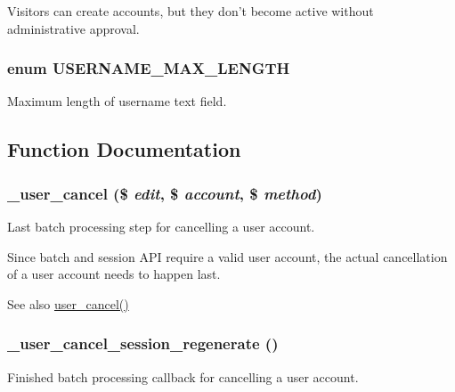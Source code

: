 \label{user_8module_a46063390f086e98c8db7e380c0fa1fd5}
Visitors can create accounts, but they don't become active without administrative approval. \hypertarget{user_8module_ab5066e0a1cb5ba39be9389bdb7341e9c}{
\subsubsection[{USERNAME\_\-MAX\_\-LENGTH}]{\setlength{\rightskip}{0pt plus 5cm}enum {\bf USERNAME\_\-MAX\_\-LENGTH}}}
\label{user_8module_ab5066e0a1cb5ba39be9389bdb7341e9c}
Maximum length of username text field. 

\subsection{Function Documentation}
\hypertarget{user_8module_afc9203f67609047039df65af5de60739}{
\subsubsection[{\_\-user\_\-cancel}]{\setlength{\rightskip}{0pt plus 5cm}\_\-user\_\-cancel (\$ {\em edit}, \/  \$ {\em account}, \/  \$ {\em method})}}
\label{user_8module_afc9203f67609047039df65af5de60739}
Last batch processing step for cancelling a user account.

Since batch and session API require a valid user account, the actual cancellation of a user account needs to happen last.

\begin{DoxySeeAlso}{See also}
\hyperlink{user_8module_af6ef747e6353edaecc43f55dc85eff9e}{user\_\-cancel()} 
\end{DoxySeeAlso}
\hypertarget{user_8module_ade553a108fdbcf811513ee0539aeebbe}{
\subsubsection[{\_\-user\_\-cancel\_\-session\_\-regenerate}]{\setlength{\rightskip}{0pt plus 5cm}\_\-user\_\-cancel\_\-session\_\-regenerate ()}}
\label{user_8module_ade553a108fdbcf811513ee0539aeebbe}
Finished batch processing callback for cancelling a user account.

